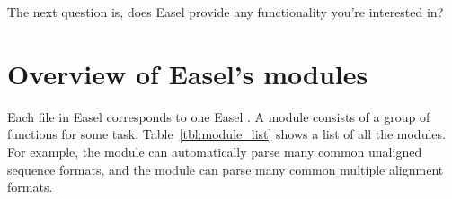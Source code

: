 The next question is, does Easel provide any functionality you're
interested in?  

\section{Overview of Easel's modules}

Each  file in Easel corresponds to one Easel .
A module consists of a group of functions for some
task. Table~\ref{tbl:module_list} shows a list of all the modules. For
example, the  module can automatically parse many common
unaligned sequence formats, and the  module can parse many
common multiple alignment formats.

%
